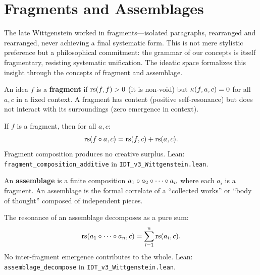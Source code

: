 \section{Fragments and Assemblages}

The late Wittgenstein worked in fragments---isolated paragraphs, rearranged and
rearranged, never achieving a final systematic form. This is not mere stylistic
preference but a philosophical commitment: the grammar of our concepts is itself
fragmentary, resisting systematic unification. The ideatic space formalizes this
insight through the concepts of fragment and assemblage.

\begin{definition}[Fragment]
\label{def:fragment}
An idea $f$ is a \textbf{fragment} if $\mathrm{rs}(f, f) > 0$ (it is non-void) but
$\kappa(f, a, c) = 0$ for all $a, c$ in a fixed context. A fragment has
content (positive self-resonance) but does not interact with its surroundings
(zero emergence in context).
\end{definition}

\begin{theorem}
\label{thm:fragment-additive}
If $f$ is a fragment, then for all $a, c$:
\[
\mathrm{rs}(f \circ a, c) = \mathrm{rs}(f, c) + \mathrm{rs}(a, c).
\]
Fragment composition produces no creative surplus.
Lean: \texttt{fragment\_composition\_additive} in
\texttt{IDT\_v3\_Wittgenstein.lean}.
\end{theorem}

\begin{definition}[Assemblage]
\label{def:assemblage}
An \textbf{assemblage} is a finite composition $a_1 \circ a_2 \circ \cdots
\circ a_n$ where each $a_i$ is a fragment. An assemblage is the formal
correlate of a ``collected works'' or ``body of thought'' composed of independent
pieces.
\end{definition}

\begin{theorem}
\label{thm:assemblage-decompose}
The resonance of an assemblage decomposes as a pure sum:
\[
\mathrm{rs}(a_1 \circ \cdots \circ a_n, c)
= \sum_{i=1}^n \mathrm{rs}(a_i, c).
\]
No inter-fragment emergence contributes to the whole.
Lean: \texttt{assemblage\_decompose} in \texttt{IDT\_v3\_Wittgenstein.lean}.
\end{theorem}

